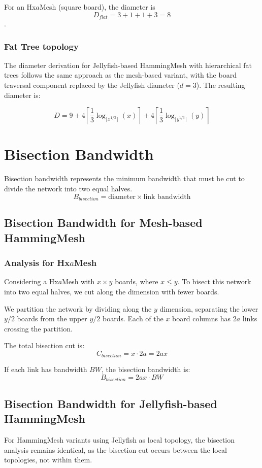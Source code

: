 \documentclass{article}
\begin{document}
For an Hx\(a\)Mesh (square board), the diameter is \[D_{flat} = 3 + 1 + 1 + 3 = 8\].

\subsubsection{Fat Tree topology}

The diameter derivation for Jellyfish-based HammingMesh with hierarchical fat trees follows the same approach as the mesh-based variant, with the board traversal component replaced by the Jellyfish diameter ($d = 3$).
The resulting diameter is:

\[D =
9
+ 4\left\lceil \frac{1}{3}\log_{\lceil x^{1/3}\rceil}\!\left(x\right) \right\rceil
+ 4\left\lceil \frac{1}{3}\log_{\lceil y^{1/3}\rceil}\!\left(y\right) \right\rceil
\]

\section{Bisection Bandwidth}

Bisection bandwidth represents the minimum bandwidth that must be cut to divide the network into two equal halves.
\[B_{bisection} = \text{diameter} \times \text{link bandwidth}\]

\subsection{Bisection Bandwidth for Mesh-based HammingMesh}

\subsubsection{Analysis for Hx\(a\)Mesh}
Considering a Hx\(a\)Mesh with $x \times y$ boards, where $x \leq y$. To bisect this network into two equal halves, we cut along the dimension with fewer boards.

We partition the network by dividing along the $y$ dimension, separating the lower $y/2$ boards from the upper $y/2$ boards. Each of the $x$ board columns has $2a$ links crossing the partition.

The total bisection cut is:
\[C_{bisection} = x \cdot 2a = 2ax\]

If each link has bandwidth $BW$, the bisection bandwidth is:
\[B_{bisection} = 2ax \cdot BW\]

\subsection{Bisection Bandwidth for Jellyfish-based HammingMesh}
For HammingMesh variants using Jellyfish as local topology, the bisection analysis remains identical, as the bisection cut occurs between the local topologies, not within them.
\end{document}
